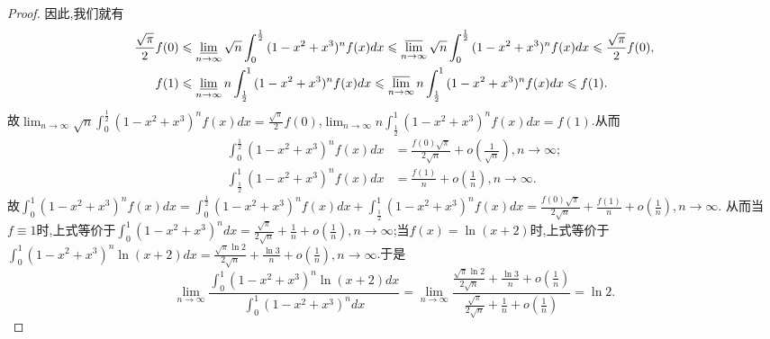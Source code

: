 \documentclass[../../main.tex]{subfiles}
\begin{document}
\begin{proof}
因此,我们就有
\begin{align*}
\frac{\sqrt{\pi}}{2}f(0)&\leqslant \varliminf_{n\rightarrow\infty}\sqrt{n}\int_0^{\frac{1}{2}}{(1 - x^2 + x^3)^nf(x)dx}\leqslant \varlimsup_{n\rightarrow\infty}\sqrt{n}\int_0^{\frac{1}{2}}{(1 - x^2 + x^3)^nf(x)dx}\leqslant \frac{\sqrt{\pi}}{2}f(0),\\
f(1)&\leqslant \varliminf_{n\rightarrow\infty}n\int_{\frac{1}{2}}^1{(1 - x^2 + x^3)^nf(x)dx}\leqslant \varlimsup_{n\rightarrow\infty}n\int_{\frac{1}{2}}^1{(1 - x^2 + x^3)^nf(x)dx}\leqslant f(1).
\end{align*}
故\(\lim_{n\rightarrow\infty}\sqrt{n}\int_0^{\frac{1}{2}}{(1 - x^2 + x^3)^nf(x)dx}=\frac{\sqrt{\pi}}{2}f(0)\),\(\lim_{n\rightarrow\infty}n\int_{\frac{1}{2}}^1{(1 - x^2 + x^3)^nf(x)dx}=f(1)\).从而
\begin{align*}
\int_0^{\frac{1}{2}}{(1 - x^2 + x^3)^nf(x)dx}&=\frac{f(0)\sqrt{\pi}}{2\sqrt{n}}+o\left(\frac{1}{\sqrt{n}}\right),  n\rightarrow\infty;\\
\int_{\frac{1}{2}}^1{(1 - x^2 + x^3)^nf(x)dx}&=\frac{f(1)}{n}+o\left(\frac{1}{n}\right),  n\rightarrow\infty.
\end{align*}
故\(\int_0^1{(1 - x^2 + x^3)^nf(x)dx}=\int_0^{\frac{1}{2}}{(1 - x^2 + x^3)^nf(x)dx}+\int_{\frac{1}{2}}^1{(1 - x^2 + x^3)^nf(x)dx}=\frac{f(0)\sqrt{\pi}}{2\sqrt{n}}+\frac{f(1)}{n}+o\left(\frac{1}{n}\right),  n\rightarrow\infty\).
从而当\(f\equiv 1\)时,上式等价于\(\int_0^1{(1 - x^2 + x^3)^ndx}=\frac{\sqrt{\pi}}{2\sqrt{n}}+\frac{1}{n}+o\left(\frac{1}{n}\right),  n\rightarrow\infty\);当\(f(x) = \ln(x + 2)\)时,上式等价于\(\int_0^1{(1 - x^2 + x^3)^n\ln(x + 2)dx}=\frac{\sqrt{\pi}\ln 2}{2\sqrt{n}}+\frac{\ln 3}{n}+o\left(\frac{1}{n}\right),  n\rightarrow\infty\).于是
\[
\lim_{n\rightarrow\infty}\frac{\int_0^1{(1 - x^2 + x^3)^n\ln(x + 2)dx}}{\int_0^1{(1 - x^2 + x^3)^ndx}}=\lim_{n\rightarrow\infty}\frac{\frac{\sqrt{\pi}\ln 2}{2\sqrt{n}}+\frac{\ln 3}{n}+o\left(\frac{1}{n}\right)}{\frac{\sqrt{\pi}}{2\sqrt{n}}+\frac{1}{n}+o\left(\frac{1}{n}\right)}=\ln 2.
\]
\end{proof}
\end{document}

